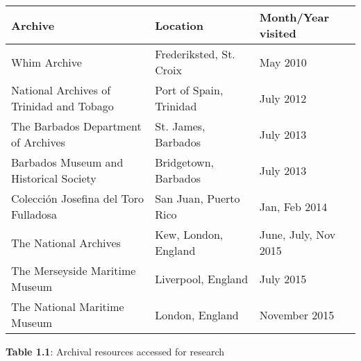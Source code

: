\begin{flushleft}
\tablefirsthead{}
\tablehead{}
\tabletail{}
\tablelasttail{}
\begin{supertabular}{m{2.6018598in}m{1.7198598in}m{1.4531599in}}
\hline
\textbf{Archive} &
\textbf{Location} &
\textbf{Month/Year visited}\\\hline
Whim Archive\ \  &
Frederiksted, St. Croix &
May 2010\\
National Archives of Trinidad and Tobago &
Port of Spain, Trinidad &
July 2012\\
The Barbados Department of Archives &
St. James, Barbados &
July 2013\\
Barbados Museum and Historical Society &
Bridgetown, Barbados &
July 2013\\
Colección Josefina del Toro Fulladosa &
San Juan, Puerto Rico &
Jan, Feb 2014\\
The National Archives\ \  &
Kew, London, England\ \  &
June, July, Nov 2015\\
The Merseyside Maritime Museum &
Liverpool, England &
July 2015\\
The National Maritime Museum &
London, England &
November 2015\\\hline
\end{supertabular}
\end{flushleft}
\begin{styleNormali}
\textbf{Table 1.1}: Archival resources accessed for research
\end{styleNormali}

